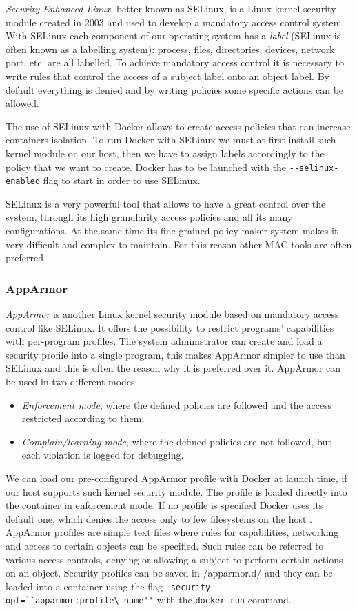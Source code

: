 \documentclass[a4paper,12pt]{article}
\newcommand{\code}[1]{\lstinline|#1|}
\begin{document}
\textit{Security-Enhanced Linux}, better known as SELinux, is a Linux kernel
security module created in 2003 and used to develop a mandatory access control
system. With SELinux each component of our operating system has a \textit{label}
(SELinux is often known as a labelling system): process, files, directories,
devices, network port, etc. are all labelled. To achieve mandatory access
control it is necessary to write rules that control the access of a subject
label onto an object label. By default everything is denied and by writing
policies some specific actions can be allowed. \par The use of SELinux with Docker allows
to create access policies that can increase containers isolation. To run Docker
with SELinux we must at first install such kernel module on our host, then we
have to assign labels accordingly to the policy that we want to create. Docker
has to be launched with the \code{--selinux-enabled} flag to start in order to
use SELinux. \par SELinux is a very powerful tool that allows to have a great
control over the system, through its high granularity access policies and all
its many configurations. At the same time its fine-grained policy maker system
makes it very difficult and complex to maintain. For this reason other MAC tools
are often preferred.

\subsubsection{AppArmor}

\textit{AppArmor} is another Linux kernel security module based on mandatory
access control like SELinux. It offers the possibility to restrict programs'
capabilities with per-program profiles. The system administrator can create and
load a security profile into a single program, this makes AppArmor simpler to
use than SELinux and this is often the reason why it is preferred over it.
AppArmor can be used in two different modes:
\begin{itemize}
  \item \textit{Enforcement mode}, where the defined policies are followed and
  the access restricted according to them; 
  \item \textit{Complain/learning mode}, where the defined policies are not
  followed, but each violation is logged for debugging.
\end{itemize}
We can load our pre-configured AppArmor profile with Docker at launch time, if
our host supports such kernel security module. The profile is loaded directly
into the container in enforcement mode. If no profile is specified Docker uses
its default one, which denies the access only to few filesystems on the host
\cite{bui_docker_security}. AppArmor profiles are simple text files where rules
for capabilities, networking and access to certain objects can be specified.
Such rules can be referred to various access controls, denying or allowing a
subject to perform certain actions on an object.   Security profiles can be
saved in /apparmor.d/ and they can be loaded into a container using the flag
\code{-security-opt=``apparmor:profile\_name''} with the \code{docker run}
command. 
\end{document}
